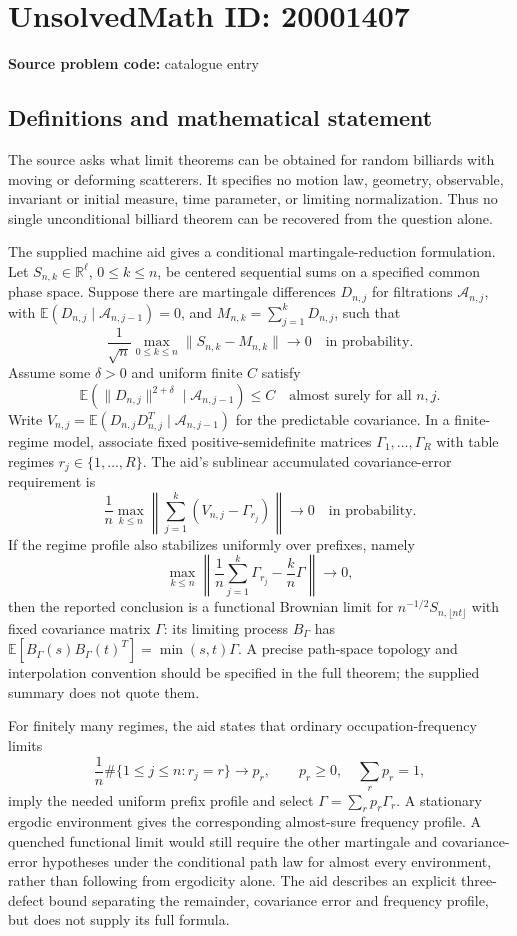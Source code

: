 \documentclass[11pt]{article}
\newcommand{\R}{\mathbb{R}}
\newcommand{\E}{\mathbb{E}}
\begin{document}
\section*{UnsolvedMath ID: 20001407}
\textbf{Source problem code:} catalogue entry
\subsection{Definitions and mathematical statement}
The source asks what limit theorems can be obtained for random billiards with moving or deforming scatterers. It specifies no motion law, geometry, observable, invariant or initial measure, time parameter, or limiting normalization. Thus no single unconditional billiard theorem can be recovered from the question alone.

The supplied machine aid gives a conditional martingale-reduction formulation. Let $S_{n,k}\in\R^\ell$, $0\leq k\leq n$, be centered sequential sums on a specified common phase space. Suppose there are martingale differences $D_{n,j}$ for filtrations $\mathcal A_{n,j}$, with $\E(D_{n,j}\mid\mathcal A_{n,j-1})=0$, and $M_{n,k}=\sum_{j=1}^kD_{n,j}$, such that
\[
 \frac1{\sqrt n}\max_{0\leq k\leq n}\|S_{n,k}-M_{n,k}\|\longrightarrow0
 \quad\text{in probability}.
\]
Assume some $\delta>0$ and uniform finite $C$ satisfy
\[
 \E(\|D_{n,j}\|^{2+\delta}\mid\mathcal A_{n,j-1})\leq C
 \quad\text{almost surely for all }n,j.
\]
Write $V_{n,j}=\E(D_{n,j}D_{n,j}^T\mid\mathcal A_{n,j-1})$ for the predictable covariance. In a finite-regime model, associate fixed positive-semidefinite matrices $\Gamma_1,\ldots,\Gamma_R$ with table regimes $r_j\in\{1,\ldots,R\}$. The aid's sublinear accumulated covariance-error requirement is
\[
 \frac1n\max_{k\leq n}\left\|\sum_{j=1}^k(V_{n,j}-\Gamma_{r_j})\right\|
 \longrightarrow0\quad\text{in probability}.
\]
If the regime profile also stabilizes uniformly over prefixes, namely
\[
 \max_{k\leq n}\left\|\frac1n\sum_{j=1}^k\Gamma_{r_j}
                         -\frac{k}{n}\Gamma\right\|\longrightarrow0,
\]
then the reported conclusion is a functional Brownian limit for $n^{-1/2}S_{n,\lfloor nt\rfloor}$ with fixed covariance matrix $\Gamma$: its limiting process $B_\Gamma$ has $\E[B_\Gamma(s)B_\Gamma(t)^T]=\min(s,t)\Gamma$. A precise path-space topology and interpolation convention should be specified in the full theorem; the supplied summary does not quote them.

For finitely many regimes, the aid states that ordinary occupation-frequency limits
\[
 \frac1n\#\{1\leq j\leq n:r_j=r\}\longrightarrow p_r,
 \qquad p_r\geq0,\quad\sum_rp_r=1,
\]
imply the needed uniform prefix profile and select $\Gamma=\sum_rp_r\Gamma_r$. A stationary ergodic environment gives the corresponding almost-sure frequency profile. A quenched functional limit would still require the other martingale and covariance-error hypotheses under the conditional path law for almost every environment, rather than following from ergodicity alone. The aid describes an explicit three-defect bound separating the remainder, covariance error and frequency profile, but does not supply its full formula.
\end{document}
